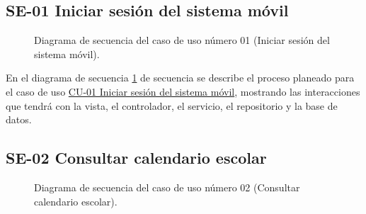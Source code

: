 \newpage

\subsection{SE-01 Iniciar sesión del sistema móvil}

\begin{figure}[htbp!]
	\begin{center}
		\caption{Diagrama de secuencia del caso de uso número 01 (Iniciar sesión del sistema móvil).}
		\label{fig:Diagrama de secuencia CU-01}
	\end{center}
\end{figure}

En el diagrama de secuencia \ref{fig:Diagrama de secuencia CU-01} de secuencia se describe el proceso planeado para el caso de uso \hyperlink{CU-01}{CU-01 Iniciar sesión del sistema móvil}, mostrando las interacciones que tendrá con la vista, el controlador, el servicio, el repositorio y la base de datos.

\newpage

\subsection{SE-02 Consultar calendario escolar}

\begin{figure}[htbp!]
	\begin{center}
		\caption{Diagrama de secuencia del caso de uso número 02 (Consultar calendario escolar).}
		\label{fig:Diagrama de secuencia CU-02}
	\end{center}
\end{figure}


